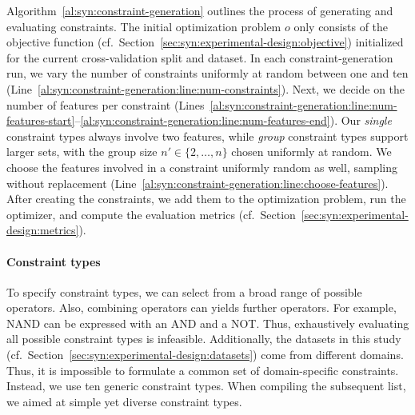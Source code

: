 Algorithm~\ref{al:syn:constraint-generation} outlines the process of generating and evaluating constraints.
The initial optimization problem $o$ only consists of the objective function (cf.~Section~\ref{sec:syn:experimental-design:objective}) initialized for the current cross-validation split and dataset.
In each constraint-generation run, we vary the number of constraints uniformly at random between one and ten (Line~\ref{al:syn:constraint-generation:line:num-constraints}).
Next, we decide on the number of features per constraint (Lines~\ref{al:syn:constraint-generation:line:num-features-start}--\ref{al:syn:constraint-generation:line:num-features-end}).
Our \emph{single} constraint types always involve two features, while \emph{group} constraint types support larger sets, with the group size $n' \in \{2, \dots, n\}$ chosen uniformly at random.
We choose the features involved in a constraint uniformly random as well, sampling without replacement (Line~\ref{al:syn:constraint-generation:line:choose-features}).
After creating the constraints, we add them to the optimization problem, run the optimizer, and compute the evaluation metrics (cf.~Section~\ref{sec:syn:experimental-design:metrics}).

\paragraph{Constraint types}

To specify constraint types, we can select from a broad range of possible operators.
Also, combining operators can yields further operators.
For example, NAND can be expressed with an AND and a NOT.
Thus, exhaustively evaluating all possible constraint types is infeasible.
Additionally, the datasets in this study (cf.~Section~\ref{sec:syn:experimental-design:datasets}) come from different domains.
Thus, it is impossible to formulate a common set of domain-specific constraints.
Instead, we use ten generic constraint types.
When compiling the subsequent list, we aimed at simple yet diverse constraint types.

